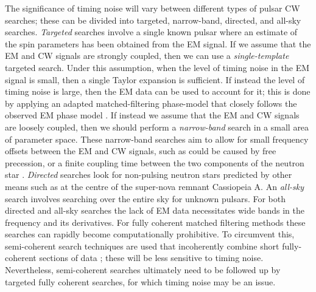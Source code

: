 \documentclass[../full_thesis/full_thesis.tex]{subfiles}
\begin{document}
The significance of timing noise will vary between different types of pulsar CW
searches; these can be divided into targeted, narrow-band, directed, and
all-sky searches.  \emph{Targeted} searches involve a single known pulsar where
an estimate of the spin parameters has been obtained from the EM signal. If we
assume that the EM and CW signals are strongly coupled, then we can use a
\emph{single-template} targeted search. Under this assumption, when the level
of timing noise in the EM signal is small, then a single Taylor expansion is
sufficient.  If instead the level of timing noise is large, then the EM data
can be used to account for it; this is done by applying an adapted
matched-filtering phase-model that closely follows the observed EM phase model
\citep{Pitkin2004}. If instead we assume that the EM and CW signals are
loosely coupled, then we should perform a \emph{narrow-band} search in a small
area of parameter space.  These narrow-band searches aim to allow for small
frequency offsets between the EM and CW signals, such as could be caused by
free precession, or a finite coupling time between the two components of the
neutron star \citep{ligo2008}. \emph{Directed} searches look for non-pulsing
neutron stars predicted by other means such as at the centre of the super-nova
remnant Cassiopeia A. An \emph{all-sky} search involves searching over the
entire sky for unknown pulsars. For both directed and all-sky searches the lack
of EM data necessitates wide bands in the frequency and its derivatives. For
fully coherent matched filtering methods these searches can rapidly become
computationally prohibitive. To circumvent this, semi-coherent search
techniques are used that incoherently combine short fully-coherent sections of
data \citep{LIGO2012}; these will be less sensitive to timing noise.
Nevertheless, semi-coherent searches  ultimately need to be followed up by
targeted fully coherent searches, for which timing noise may be an issue.
\end{document}
